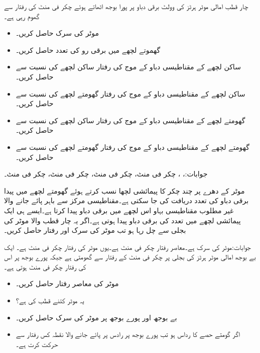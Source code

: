 چار قطب امالی موٹر  ہرٹز کی  وولٹ برقی دباو پر پورا بوجھ اٹھاتے ہوئے  چکر فی منٹ کی رفتار سے گھوم رہی ہے۔
\begin{itemize}
\item
موٹر کی سرک  حاصل کریں۔
\item
گھموتے لچھے میں برقی رو کی تعدد حاصل کریں۔
\item
ساکن لچھے کے مقناطیسی دباو کے موج کی رفتار ساکن لچھے کی نسبت سے حاصل کریں۔
\item
ساکن لچھے کے مقناطیسی دباو کے موج کی رفتار گھومتے لچھے کی نسبت سے حاصل کریں۔
\item
گھومتے لچھے کے مقناطیسی دباو کے موج کی رفتار ساکن لچھے کی نسبت سے حاصل کریں۔
\item
گھومتے لچھے کے مقناطیسی دباو کے موج کی رفتار گھومتے لچھے کی نسبت سے حاصل کریں۔
\end{itemize} 

جوابات:، ،  چکر فی منٹ،  چکر فی منٹ،  چکر فی منٹ،  چکر فی منٹ۔

موٹر کے دھرے پر چند چکر کا پیمائشی لچھا نسب کرتے ہوئے گھومتے لچھے میں پیدا برقی دباو  کی تعدد دریافت کی جا سکتی ہے۔مقناطیسی مرکز سے باہر پائے جانے والا غیر مطلوب مقناطیسی بہاو اس لچھے میں برقی دباو پیدا کرتا ہے۔ایسے ہی ایک پیمائشی لچھے میں  تعدد  کی برقی دباو پیدا ہوتی ہے۔اگر یہ چار قطب والا موٹر  کی بجلی سے چل رہا ہو تب موٹر کی سرک اور رفتار حاصل کریں۔

 جوابات:موٹر کی سرک  ہے۔معاصر رفتار  چکر فی منٹ ہے۔یوں موٹر کی رفتار   چکر فی منٹ ہے۔
ایک بے بوجھ امالی موٹر  ہرٹز کی بجلی پر  چکر فی منٹ کے رفتار سے گھومتی ہے جبکہ پورے بوجھ پر اس کی رفتار   چکر فی منٹ ہوتی ہے۔
\begin{itemize}
\item
موٹر کی معاصر رفتار حاصل کریں۔ 
 \item
یہ موٹر کتنے قطب کی ہے؟
\item
بے بوجھ اور پورے بوجھ پر موٹر کی سرک حاصل کریں۔
\item
اگر گومتے حصے کا رداس  ہو تب پورے بوجھ پر رادس پر پائے جانے والا نقطہ کس رفتار سے حرکت کرت ہے۔ 
\end{itemize}

